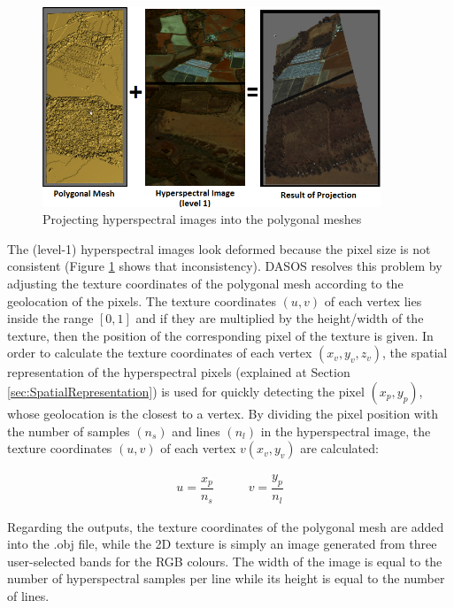 \documentclass{subfiles}
\begin{document}
	
		 \begin{figure} [h!]
		 	\centering
		 	\includegraphics[width=0.9\textwidth]{img/ProjectingHyperspectral}
		 	\caption{Projecting hyperspectral images into the polygonal meshes}
		 	\label{fig:ProjectingHyperspectral}
		 \end{figure}
		 

	
			
	\par  The (level-1) hyperspectral images look deformed because the pixel size is not consistent (Figure \ref{fig:ProjectingHyperspectral} shows that inconsistency).
	 DASOS resolves this problem by adjusting the texture coordinates of the polygonal mesh according to the geolocation of the pixels. The texture coordinates $(u, v)$ of each vertex lies inside the range $[0, 1]$ and if they are multiplied by the height/width of the texture, then the position of the corresponding pixel of the texture is given. In order to calculate the texture coordinates of each vertex $(x_v, y_v, z_v)$, the spatial representation of the hyperspectral pixels (explained at Section \ref{sec:SpatialRepresentation}) is used for quickly detecting the pixel $(x_p, y_p )$, whose geolocation is the closest to a vertex. By dividing the pixel position with the number of samples $(n_s)$ and lines $(n_l)$ in the hyperspectral image, the texture coordinates $(u, v)$ of each vertex $v(x_v , y_v)$ are calculated:
		
	\begin{eqnarray}
	u=\dfrac{x_p}{n_s} \;\;\;\;\;\;\;\;\;\; v=\dfrac{y_p}{n_l}
	\end{eqnarray}
	
	\par Regarding the outputs, the texture coordinates of the polygonal mesh are added into the .obj file, while the 2D texture is simply an image generated from three user-selected bands for the RGB colours. The width of the image is equal to the number of hyperspectral samples per line while its height is equal to the number of lines.
	
\end{document}
